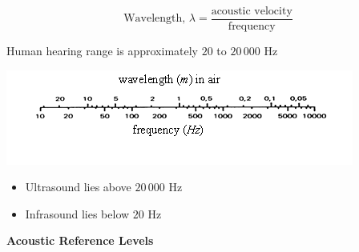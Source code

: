 \documentclass[
]{book}
\providecommand{\tightlist}{%
  \setlength{\itemsep}{0pt}\setlength{\parskip}{0pt}}
\begin{document}
\[
\text{Wavelength, } \lambda = \frac{\text{acoustic velocity}}{\text{frequency}}
\]

Human hearing range is approximately \(20\) to \(20\,000 \text{ Hz}\)

\includegraphics{media/13/image1.png}

\begin{itemize}
\tightlist
\item
  Ultrasound lies above \(20\,000 \text{ Hz}\)
\item
  Infrasound lies below \(20 \text{ Hz}\)
\end{itemize}

\textbf{Acoustic Reference Levels}
\end{document}
